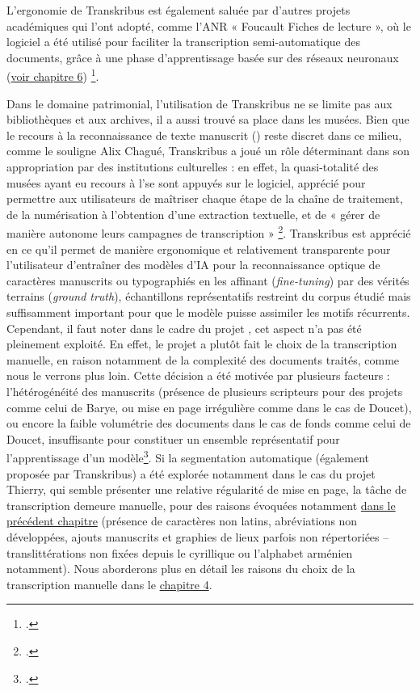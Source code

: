 L’ergonomie de Transkribus est également saluée par d'autres projets académiques qui l’ont adopté, comme l'ANR « Foucault Fiches de lecture », où le logiciel a été utilisé pour faciliter la transcription semi-automatique des documents, grâce à une phase d'apprentissage basée sur des réseaux neuronaux (\hyperlink{chap6}{voir chapitre 6}) \footcite[p.104]{bermes_patrimoine_2020}.

Dans le domaine patrimonial, l’utilisation de Transkribus ne se limite pas aux bibliothèques et aux archives, il a aussi trouvé sa place dans les musées. Bien que le recours à la reconnaissance de texte manuscrit (\htr) reste discret dans ce milieu, comme le souligne Alix Chagué, Transkribus a joué un rôle déterminant dans son appropriation par des institutions culturelles : en effet, la quasi-totalité des musées ayant eu recours à l’\htr se sont appuyés sur le logiciel, apprécié pour permettre aux utilisateurs de maîtriser chaque étape de la chaîne de traitement, de la numérisation à l’obtention d’une extraction textuelle, et de « gérer de manière autonome leurs campagnes de transcription » \footcite[p.4]{chague_intelligence_2022}. Transkribus est apprécié en ce qu’il permet de manière ergonomique et relativement transparente pour l’utilisateur d’entraîner des modèles d’IA pour la reconnaissance optique de caractères manuscrits ou typographiés en les affinant (\textit{fine-tuning}) par des vérités terrains (\textit{ground truth}), échantillons représentatifs restreint du corpus étudié mais suffisamment important pour que le modèle puisse assimiler les motifs récurrents.
Cependant, il faut noter dans le cadre du projet \pense, cet aspect n’a pas été pleinement exploité. En effet, le projet a plutôt fait le choix de la transcription manuelle, en raison notamment de la complexité des documents traités, comme nous le verrons plus loin. 
Cette décision a été motivée par plusieurs facteurs : l’hétérogénéité des manuscrits (présence de plusieurs scripteurs pour des projets comme celui de Barye, ou mise en page irrégulière comme dans le cas de Doucet), ou encore la faible volumétrie des documents dans le cas de fonds comme celui de Doucet, insuffisante pour constituer un ensemble représentatif pour l'apprentissage d’un modèle\footcite{carius_plateforme_2020}. Si la segmentation automatique (également proposée par Transkribus) a été explorée notamment dans le cas du projet Thierry, qui semble présenter une relative régularité de mise en page, la tâche de transcription demeure manuelle, pour des raisons évoquées notamment \hyperlink{chap1}{dans le précédent chapitre} (présence de caractères non latins, abréviations non développées, ajouts manuscrits et graphies de lieux parfois non répertoriées – translittérations non fixées depuis le cyrillique ou l’alphabet arménien notamment). Nous aborderons plus en détail les raisons du choix de la transcription manuelle dans le \hyperlink{chap4}{chapitre 4}.
\newline
{}\\

